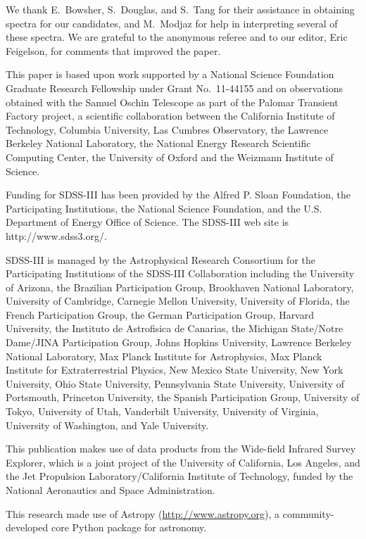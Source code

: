 \documentclass{emulateapj}
\begin{document}
\acknowledgments
We thank E.~Bowsher, S.~Douglas, and S.~Tang for their assistance in obtaining spectra for our candidates, and M.~Modjaz for help in interpreting several of these spectra. We are grateful to the anonymous referee and to our editor, Eric Feigelson, for comments that improved the paper.

This paper is based upon work supported by a National Science Foundation Graduate Research Fellowship under Grant No.\ 11-44155 and on observations obtained with the Samuel Oschin Telescope as part of the Palomar Transient Factory project, a scientific collaboration between the California Institute of Technology, Columbia University, Las Cumbres Observatory, the Lawrence Berkeley National Laboratory, the National Energy Research Scientific Computing Center, the University of Oxford and the Weizmann Institute of Science. 

Funding for SDSS-III has been provided by the Alfred P. Sloan Foundation, the Participating Institutions, the National Science Foundation, and the U.S. Department of Energy Office of Science. The SDSS-III web site is http://www.sdss3.org/.

SDSS-III is managed by the Astrophysical Research Consortium for the Participating Institutions of the SDSS-III Collaboration including the University of Arizona, the Brazilian Participation Group, Brookhaven National Laboratory, University of Cambridge, Carnegie Mellon University, University of Florida, the French Participation Group, the German Participation Group, Harvard University, the Instituto de Astrofisica de Canarias, the Michigan State/Notre Dame/JINA Participation Group, Johns Hopkins University, Lawrence Berkeley National Laboratory, Max Planck Institute for Astrophysics, Max Planck Institute for Extraterrestrial Physics, New Mexico State University, New York University, Ohio State University, Pennsylvania State University, University of Portsmouth, Princeton University, the Spanish Participation Group, University of Tokyo, University of Utah, Vanderbilt University, University of Virginia, University of Washington, and Yale University. 

This publication makes use of data products from the Wide-field Infrared Survey Explorer, which is a joint project of the University of California, Los Angeles, and the Jet Propulsion Laboratory/California Institute of Technology, funded by the National Aeronautics and Space Administration.

This research made use of Astropy (\url{http://www.astropy.org}), a community-developed core Python package for astronomy.
\end{document}
